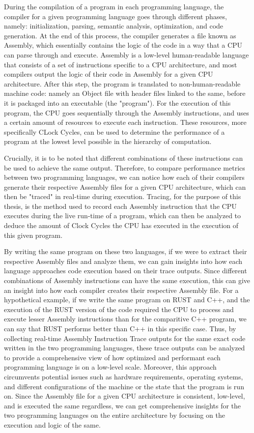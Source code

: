 \documentclass[conference]{IEEEtran}
\begin{document}
During the compilation of a program in each programming language, the compiler for a given programming language goes through different phases, namely: initialization, parsing, semantic analysis, optimization, and code generation. At the end of this process, the compiler generates a file known as Assembly, which essentially contains the logic of the code in a way that a CPU can parse through and execute. Assembly is a low-level human-readable language that consists of a set of instructions specific to a CPU architecture, and most compilers output the logic of their code in Assembly for a given CPU architecture. After this step, the program is translated to non-human-readable machine code: namely an Object file with header files linked to the same, before it is packaged into an executable (the "program"). For the execution of this program, the CPU goes sequentially through the Assembly instructions, and uses a certain amount of resources to execute each instruction. These resources, more specifically CLock Cycles, can be used to determine the performance of a program at the lowest level possible in the hierarchy of computation. 

Crucially, it is to be noted that different combinations of these instructions can be used to achieve the same output. Therefore, to compare performance metrics between two programming languages, we can notice how each of their compilers generate their respective Assembly files for a given CPU architecture, which can then be "traced" in real-time during execution. Tracing, for the purpose of this thesis, is the method used to record each Assembly instruction that the CPU executes during the live run-time of a program, which can then be analyzed to deduce the amount of Clock Cycles the CPU has executed in the execution of this given program. 

By writing the same program on these two languages, if we were to extract their respective Assembly files and analyze them, we can gain insights into how each language approaches code execution based on their trace outputs. Since different combinations of Assembly instructions can have the same execution, this can give an insight into how each compiler creates their respective Assembly file. For a hypothetical example, if we write the same program on RUST and C++, and the execution of the RUST version of the code required the CPU to process and execute lesser Assembly instructions than for the comparitive C++ program, we can say that RUST performs better than C++ in this specific case. Thus, by collecting real-time Assembly Instruction Trace outputs for the same exact code written in the two programming languages, these trace outputs can be analyzed to provide a comprehensive view of how optimized and performant each programming language is on a low-level scale. Moreover, this approach circumvents potential issues such as hardware requirements, operating systems, and different configurations of the machine or the state that the program is run on. Since the Assembly file for a given CPU architecture is consistent, low-level, and is executed the same regardless, we can get comprehensive insights for the two programming languages on the entire architecture by focusing on the execution and logic of the same. 
\end{document}
